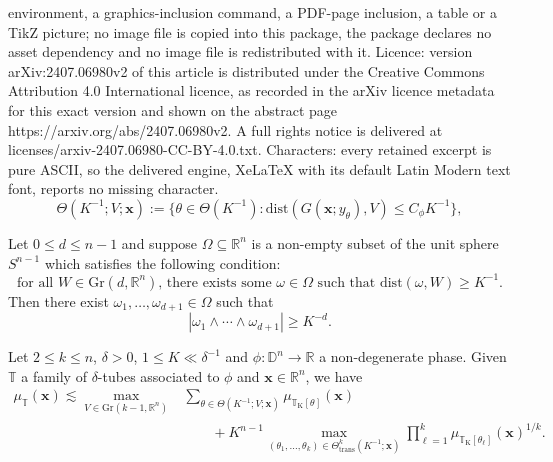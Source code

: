 \documentclass[10pt,a4paper]{amsart}
\newcommand{\D}{\mathbb{D}}
\newcommand{\R}{\mathbb{R}}
\newcommand{\T}{\mathbb{T}}
\newcommand{\bx}{\mathbf{x}}
\newcommand{\dist}{\mathrm{dist}}
\newcommand{\trans}{\mathrm{trans}}
\begin{document}
environment, a graphics-inclusion command, a PDF-page inclusion, a table or a TikZ picture; no image file is copied into this package, the package declares no asset dependency and no image file is redistributed with it. Licence: version arXiv:2407.06980v2 of this article is distributed under the Creative Commons Attribution 4.0 International licence, as recorded in the arXiv licence metadata for this exact version and shown on the abstract page https://arxiv.org/abs/2407.06980v2. A full rights notice is delivered at licenses/arxiv-2407.06980-CC-BY-4.0.txt. Characters: every retained excerpt is pure ASCII, so the delivered engine, XeLaTeX with its default Latin Modern text font, reports no missing character.
\begin{equation}\label{eq: V aligned caps}
    \Theta(K^{-1};V; \bx) := \big\{ \theta \in \Theta(K^{-1}) : \dist(G(\bx ;y_{\theta}), V) \leq C_{\phi} K^{-1} \big\},
\end{equation}

\begin{lemma}\label{lem: transversality} Let $0 \leq d \leq n-1$ and suppose $\Omega \subseteq \R^n$ is a non-empty subset of the unit sphere $S^{n-1}$ which satisfies the following condition:
\begin{equation}\label{eq: broad points}
    \textrm{for all $W \in \mathrm{Gr}(d,\R^n)$, there exists some $\omega \in \Omega$ such that $\dist(\omega, W) \geq K^{-1}$.}
\end{equation}
Then there exist $\omega_1, \dots, \omega_{d+1} \in \Omega$ such that 
\begin{equation*}
    |\omega_1 \wedge \cdots \wedge \omega_{d+1}| \geq K^{-d}.
\end{equation*}
\end{lemma}

\begin{lemma}\label{lem: b/n dec pointwise} Let $2 \leq k \leq n$, $\delta > 0$, $1 \leq K \ll \delta^{-1}$ and $\phi \colon \D^n \to \R$ a non-degenerate phase. Given $\T$ a family of $\delta$-tubes associated to $\phi$ and $\bx \in \R^n$, we have
\begin{align}\label{eq: b/n dec pointwise}
\mu_{\T}(\bx) \lesssim \max_{V \in \mathrm{Gr}(k-1,\R^n)} &\sum_{\theta \in \Theta(K^{-1}; V; \bx)}\mu_{\T_{\mathrm{K}}[\theta]}(\bx) \\
\nonumber
&\qquad + K^{n-1} \max_{(\theta_1, \dots, \theta_k) \in \Theta^k_{\trans}(K^{-1}; \bx)}  \prod_{\ell = 1}^k \mu_{\T_{\mathrm{K}}[\theta_{\ell}]}(\bx)^{1/k}.
\end{align}
\end{lemma}
\end{document}
